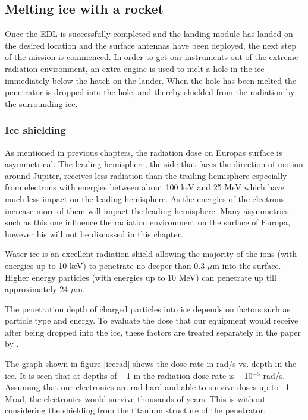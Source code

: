 \subsection{Melting ice with a rocket}

Once the EDL is successfully completed and the landing module has landed on the desired location and the surface antennas have been deployed, the next step of the mission is commenced. In order to get our instruments out of the extreme radiation environment, an extra engine is used to melt a hole in the ice immediately below the hatch on the lander. When the hole has been melted the penetrator is dropped into the hole, and thereby shielded from the radiation by the surrounding ice. 

\subsubsection{Ice shielding}

As mentioned in previous chapters, the radiation dose on Europas surface is asymmetrical. The leading hemisphere, the side that faces the direction of motion around Jupiter, receives less radiation than the trailing hemisphere especially from electrons with energies between about 100 keV and
25 MeV which have much less impact on the leading hemisphere. As the energies of the electrons increase more of them will impact the leading hemisphere. Many asymmetries such as this one influence the radiation environment on the surface of Europa, however his will not be discussed in this chapter. 


Water ice is an excellent radiation shield allowing the majority of the ions (with energies up to 10 keV) to penetrate no deeper than 0.3 $\mu$m into the surface. Higher energy particles (with energies up to 10 MeV) can penetrate up till approximately 24 $\mu$m. \cite{Paranicas_2009}

The penetration depth of charged particles into ice depends on factors such as particle type and energy. To evaluate the dose that our equipment would receive after being dropped into the ice, these factors are treated separately in the paper by  \cite{Paranicas_2009}.

The graph shown in figure \ref{icerad} shows the dose rate in rad/s vs. depth in the ice. 
It is seen that at depths of ~ 1 m the radiation dose rate is ~ 10$^{-5}$ rad/s. Assuming that our electronics are rad-hard and able to survive doses up to ~1 Mrad, the electronics would survive thousands of years. This is without considering the shielding from the titanium structure of the penetrator. 

